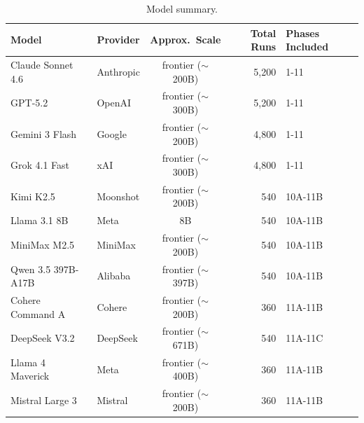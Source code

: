 \begin{table}[t]
\centering
\caption{Model summary.}
\label{tab:models}
\small
\begin{tabular}{llcrl}
\toprule
Model & Provider & Approx.\ Scale & Total Runs & Phases Included \\
\midrule
    Claude Sonnet 4.6 & Anthropic & frontier ($\sim$200B) & 5,200 & 1-11 \\
    GPT-5.2 & OpenAI & frontier ($\sim$300B) & 5,200 & 1-11 \\
    Gemini 3 Flash & Google & frontier ($\sim$200B) & 4,800 & 1-11 \\
    Grok 4.1 Fast & xAI & frontier ($\sim$300B) & 4,800 & 1-11 \\
    \midrule
    Kimi K2.5 & Moonshot & frontier ($\sim$200B) & 540 & 10A-11B \\
    Llama 3.1 8B & Meta & 8B & 540 & 10A-11B \\
    MiniMax M2.5 & MiniMax & frontier ($\sim$200B) & 540 & 10A-11B \\
    Qwen 3.5 397B-A17B & Alibaba & frontier ($\sim$397B) & 540 & 10A-11B \\
    \midrule
    Cohere Command A & Cohere & frontier ($\sim$200B) & 360 & 11A-11B \\
    DeepSeek V3.2 & DeepSeek & frontier ($\sim$671B) & 540 & 11A-11C \\
    Llama 4 Maverick & Meta & frontier ($\sim$400B) & 360 & 11A-11B \\
    Mistral Large 3 & Mistral & frontier ($\sim$200B) & 360 & 11A-11B \\
\bottomrule
\end{tabular}
\end{table}
